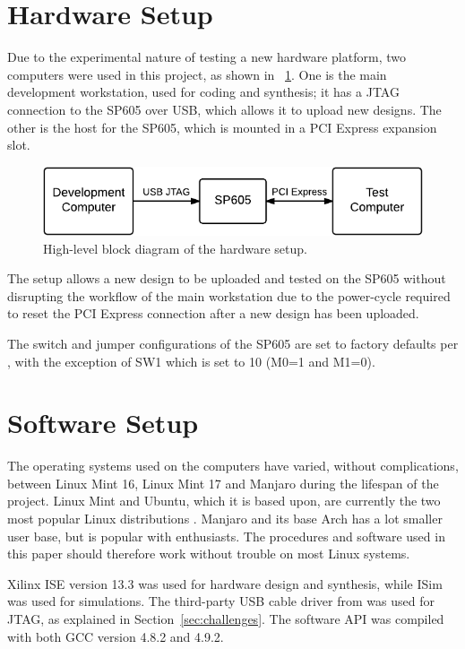 \section{Hardware Setup}

Due to the experimental nature of testing a new hardware platform, two computers were used in this project, as shown in \figurename~\ref{fig:hardware-setup}.
One is the main development workstation, used for coding and synthesis; it has a JTAG connection to the SP605 over USB, which allows it to upload new designs.
The other is the host for the SP605, which is mounted in a PCI Express expansion slot.

\begin{figure}[!ht]
    \centering
    \includegraphics[width=32\block]{figures/hardware-setup}
    \caption[Hardware setup]{
        High-level block diagram of the hardware setup.
    }
    \label{fig:hardware-setup}
\end{figure}

The setup allows a new design to be uploaded and tested on the SP605 without disrupting the workflow of the main workstation due to the power-cycle required to reset the PCI Express connection after a new design has been uploaded.

The switch and jumper configurations of the SP605 are set to factory defaults per \cite{ug526}, with the exception of SW1 which is set to 10 (M0=1 and M1=0).

\section{Software Setup}

The operating systems used on the computers have varied, without complications, between Linux Mint 16, Linux Mint 17 and Manjaro during the lifespan of the project.
Linux Mint and Ubuntu, which it is based upon, are currently the two most popular Linux distributions \cite{distrowatch}.
Manjaro and its base Arch has a lot smaller user base, but is popular with enthusiasts.
The procedures and software used in this paper should therefore work without trouble on most Linux systems.

Xilinx ISE version 13.3 was used for hardware design and synthesis, while ISim was used for simulations.
The third-party USB cable driver from \cite{usbdriver} was used for JTAG, as explained in Section~\ref{sec:challenges}.
The software API was compiled with both GCC version 4.8.2 and 4.9.2.

